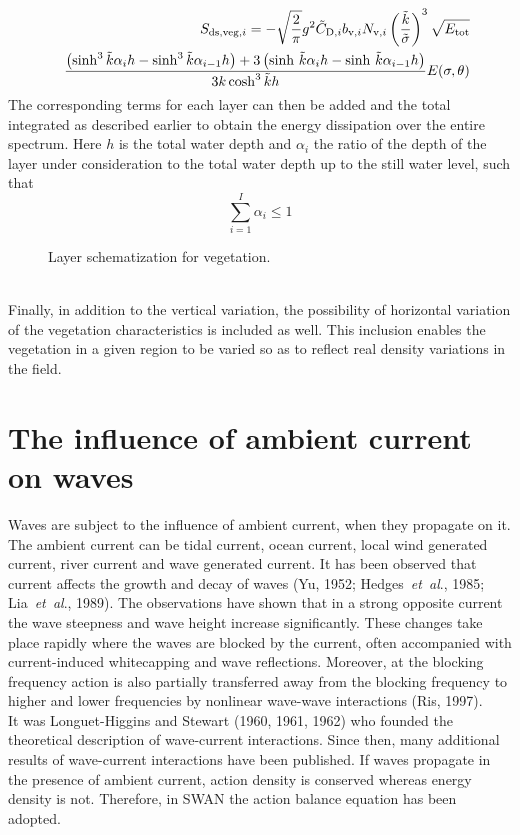 \documentclass[12pt]{book}
\begin{document}
\begin{eqnarray}
  &&S_{{\rm ds,veg},i} = -\sqrt{\frac{2}{\pi}} g^2 {\tilde C}_{{\rm D},i} b_{{\rm v},i} N_{{\rm v},i} \left( \frac{{\tilde{k}}}{{\tilde{\sigma}}} \right)^3
                   \sqrt{E_{\rm tot}} \nonumber \\
                   &&\frac{\left(\sinh^3 {\tilde{k}}\alpha_i h - \sinh^3 {\tilde{k}}\alpha_{i-1} h\right) +
                    3\left( \sinh\, {\tilde{k}}\alpha_i h - \sinh\, {\tilde{k}}\alpha_{i-1} h\right)}
                   {3k\cosh^3 {\tilde{k}}h} E(\sigma,\theta)
\end{eqnarray}
The corresponding terms for each layer can then be added and the total integrated as
described earlier to obtain the energy dissipation over the entire spectrum.
Here $h$ is the total water depth and $\alpha_i$ the ratio of the depth of the layer under
consideration to the total water depth up to the still water level, such that
\begin{equation}
  \sum_{i=1}^{I} \alpha_i \leq 1
\end{equation}
\begin{figure}[htb]
   \centerline{
              }
      \caption{Layer schematization for vegetation.}
      \label{fig:veglay}
\end{figure}
\\[2ex]
\noindent
Finally, in addition to the vertical variation, the possibility of horizontal variation of the
vegetation characteristics is included as well. This inclusion enables the vegetation in a
given region to be varied so as to reflect real density variations in the field.

\section{The influence of ambient current on waves} \label{sec:curre}

Waves are subject to the influence of ambient current, when they propagate on it. The ambient current
can be tidal current, ocean current, local wind generated current, river current and wave generated
current. It has been observed that current affects the growth and decay of waves (Yu, 1952;
Hedges~{\it et~al}., 1985; Lia~{\it et~al}., 1989). The observations have shown that in a strong opposite
current the wave steepness and wave height increase significantly. These changes take place rapidly
where the waves are blocked by the current, often accompanied with current-induced whitecapping and wave
reflections. Moreover, at the blocking frequency action is also partially transferred away from the blocking
frequency to higher and lower frequencies by nonlinear wave-wave interactions (Ris, 1997).
\\[2ex]
\noindent
It was Longuet-Higgins and Stewart (1960, 1961, 1962) who founded the theoretical description of wave-current
interactions. Since then, many additional results of wave-current interactions have been published. If waves
propagate in the presence of ambient current, action density is conserved whereas energy density is not.
Therefore, in SWAN the action balance equation has been adopted.
\end{document}
